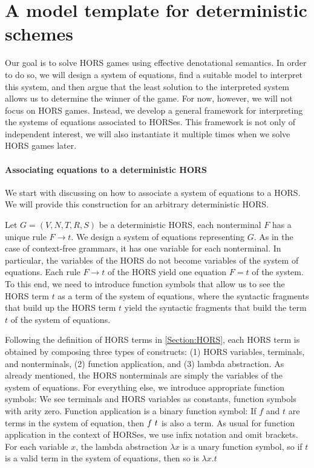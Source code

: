 \documentclass[../../diss.tex]{subfiles}
\begin{document}
\section{A model template for deterministic schemes}%
\label{Section:HORSTemplate}%

Our goal is to solve HORS games using effective denotational semantics.
In order to do so, we will design a system of equations, find a suitable model to interpret this system, and then argue that the least solution to the interpreted system allows us to determine the winner of the game.
For now, however, we will not focus on HORS games.
Instead, we develop a general framework for interpreting the systems of equations associated to HORSes.
This framework is not only of independent interest, we will also instantiate it multiple times when we solve HORS games later.

\paragraph{Associating equations to a deterministic HORS}

We start with discussing on how to associate a system of equations to a HORS.\@
We will provide this construction for an arbitrary deterministic HORS.\@

Let $G = (V,N,T,R,S)$ be a deterministic HORS, \ie each nonterminal $F$ has a unique rule $F \to t$.
We design a system of equations representing $G$.
As in the case of context-free grammars, it has one variable for each nonterminal.
In particular, the variables of the HORS do not become variables of the system of equations.
Each rule $F \to t$ of the HORS yield one equation $F = t$ of the system.
To this end, we need to introduce function symbols that allow us to see the HORS term $t$ as a term of the system of equations, where the syntactic fragments that build up the HORS term $t$ yield the syntactic fragments that build the term $t$ of the system of equations.

Following the definition of HORS terms in \cref{Section:HORS}, each HORS term is obtained by composing three types of constructs:
(1) HORS variables, terminals, and nonterminals,
(2) function application, and
(3) lambda abstraction.
As already mentioned, the HORS nonterminals are simply the variables of the system of equations.
For everything else, we introduce appropriate function symbols:
We see terminals and HORS variables as constants, function symbols with arity zero.
Function application is a binary function symbol: If $f$ and $t$ are terms in the system of equation, then $f\  t$ is also a term.
As usual for function application in the context of HORSes, we use infix notation and omit brackets.
For each variable $x$, the lambda abstraction  $\lambda x$ is a unary function symbol, so if $t$ is a valid term in the system of equations, then so is $\lambda x. t$
\end{document}
